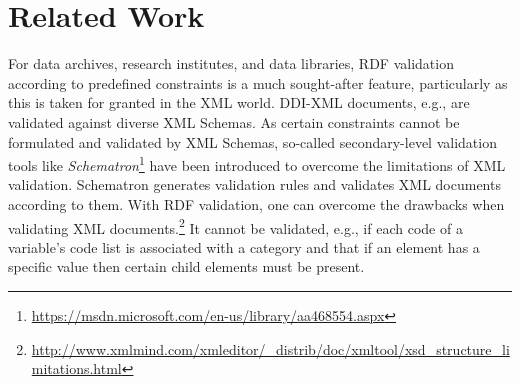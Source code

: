 \documentclass[conference]{IEEEtran}
\begin{document}
%






\section{Related Work}
\label{related-work}

For data archives, research institutes, and data libraries,
RDF validation according to predefined constraints is a much sought-after feature, 
particularly as this is taken for granted in the XML world.
DDI-XML documents, e.g., are validated against diverse XML Schemas.
As certain constraints cannot be formulated and validated by XML Schemas, 
so-called secondary-level validation tools like \emph{Schematron}\footnote{\url{https://msdn.microsoft.com/en-us/library/aa468554.aspx}} 
have been introduced to overcome the limitations of XML validation.
Schematron generates validation rules and validates XML documents according to them.
With RDF validation, one can overcome the drawbacks when validating XML documents.\footnote{\url{http://www.xmlmind.com/xmleditor/_distrib/doc/xmltool/xsd_structure_limitations.html}}
It cannot be validated, e.g., if each code of a variable's code list is associated with a category and that if an element has a specific value then certain child elements must be present.  
\end{document}
